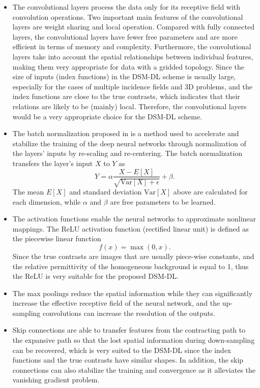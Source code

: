 \documentclass{article}
\begin{document}
 \begin{itemize}
\item The convolutional layers process the data only for its receptive field with convolution operations. Two important main features of the convolutional layers are weight sharing and local operation. Compared with fully connected layers, the convolutional layers have fewer free parameters and are more efficient in terms of memory and complexity. Furthermore, the convolutional layers take into account the spatial relationships between individual features, making them very appropriate for data with a gridded topology. Since the size of inputs (index functions) in the DSM-DL scheme is usually large, especially for the cases of multiple incidence fields and 3D problems, and the index functions are close to the true contrasts, which indicates that their relations are likely to be (mainly) local. Therefore, the convolutional layers would be a very appropriate choice for the DSM-DL scheme.
    \item 
 The batch normalization proposed in\cite{ioffe2015batch} is a method used to accelerate and stabilize the training of the deep neural networks through normalization of the layers' inputs by re-scaling and re-centering. The batch normalization transfers the layer's input $X$ to $Y$ as
\begin{equation}
	Y=\alpha\frac{X-E[X]}{\sqrt{\text{Var}[X] + \epsilon}}+\beta. 
\end{equation}  
The mean $E[X]$ and standard deviation $\text{Var}[X]$ above are calculated for each dimension, while $\alpha$ and $\beta$ are free parameters to be learned.

\item The activation functions enable the neural networks to approximate nonlinear mappings. The ReLU activation function (rectified linear unit) is defined as the piecewise linear function
\begin{equation}
	f(x)=\max(0,x).
\end{equation}
Since the true contrasts are images that are usually piece-wise constants, and the relative permittivity of the homogeneous background is equal to 1, thus the ReLU is very suitable for the proposed DSM-DL.

\item The max poolings reduce the spatial information while they can significantly increase the effective receptive field of the neural network, and the up-sampling convolutions can increase the resolution of the outputs.

\item Skip connections are able to transfer features from the contracting path to the expansive path so that the lost spatial information during down-sampling can be recovered, which is very suited to the DSM-DL since the index functions and the true contrasts have similar shapes. In addition, the skip connections can also stabilize the training and convergence as it alleviates the vanishing gradient problem. 
\end{itemize}
\end{document}

